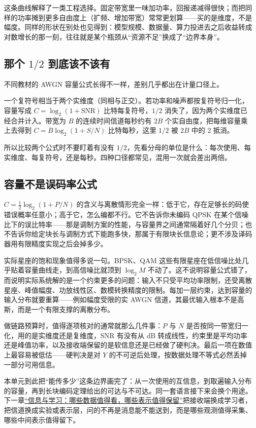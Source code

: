 这条曲线解释了一类工程选择。固定带宽里一味加功率，回报递减得很快；而把同样的功率摊到更多自由度上（扩频、增加带宽）常常更划算——买的是维度，不是幅度。同样的形状在别处也见得到：模型规模、数据量、算力投进去之后收益转成对数增长的那一刻，往往就是某个瓶颈从``资源不足''换成了``边界本身''。

\subsection{\texorpdfstring{那个 \(1/2\) 到底该不该有}{那个二分之一到底该不该有}}

不同教材的 AWGN 容量公式长得不一样，差别几乎都出在计量口径上。

一个复符号相当于两个实维度（同相与正交）。若功率和噪声都按复符号归一化，容量写成 \(C=\log_2(1+\mathrm{SNR})\) 比特每复符号，\(1/2\) 消失了，因为两个实维度已经合并计入。带宽为 \(B\) 的连续时间信道每秒约有 \(2B\) 个实自由度，把每维容量乘上去得到 \(C=B\log_2(1+S/N)\) 比特每秒，这里 \(1/2\) 被 \(2B\) 中的 2 抵消。

所以比较两个公式时不要盯着有没有 \(1/2\)，先看分母的单位是什么：每次使用、每实维度、每复符号，还是每秒。四种口径都常见，混用一次就会差出两倍。

\subsection{容量不是误码率公式}

\(C=\frac12\log_2(1+P/N)\) 的含义与离散情形完全一样：低于它，存在足够长的码使错误概率任意小；高于它，怎么编都不行。它不告诉你未编码 QPSK 在某个信噪比下的误比特率——那是调制方案的性能，与容量界之间通常隔着好几个分贝；也不告诉你给定块长与调制方式下能跑多快，那属于有限块长信息论；更不涉及译码器用有限精度实现之后会掉多少。

实际星座的饱和现象值得多说一句。BPSK、QAM 这些有限星座在低信噪比处几乎贴着容量曲线走，到高信噪比就顶到 \(\log_2 M\) 不动了。这不说明容量公式错了，而说明实际系统解的是一个约束更多的问题：输入不只受平均功率限制，还受离散星座、峰值幅度、功放线性区、数模转换精度的限制。每加一层约束，达到容量的输入分布就要重算——例如幅度受限的实 AWGN 信道，其最优输入根本不是高斯，而是一个有限支撑的离散分布。

做链路预算时，值得逐项核对的通常就那么几件事：\(P\) 与 \(N\) 是否按同一带宽归一化，用的是实维度还是复维度，SNR 有没有从 dB 转成线性，约束里是平均功率还是峰值功率，以及接收端保留的是软信息还是已经做了硬判决。最后一项在数值上最容易被低估——硬判决是对 \(Y\) 的不可逆后处理，按数据处理不等式必然丢掉一部分可用信息。

本单元到此把``能传多少''这条边界画完了：从一次使用的互信息，到取遍输入分布的容量，再到长块编码定理给出的可达与不可达。同一套语言接下来会换个用途。下一章\hyperref[ch:059]{``信息与学习：哪些数据值得看，哪些表示值得保留''}把接收端换成学习者，把信道换成实验或表示层，问的不再是消息能不能送到，而是哪些观测值得采集、哪些中间表示值得留下。
